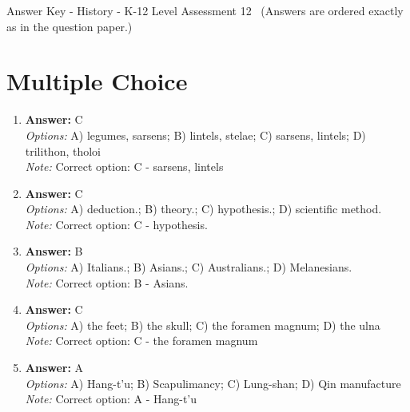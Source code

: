 \documentclass[12pt]{article}
\begin{document}
\begin{center}
Answer Key - History - K-12 Level Assessment 12 \
\small (Answers are ordered exactly as in the question paper.)
\end{center}

\section*{Multiple Choice}
\begin{enumerate}[label=\arabic*.]
\item \textbf{Answer:} C
\\ \textit{Options:} A) legumes, sarsens; B) lintels, stelae; C) sarsens, lintels; D) trilithon, tholoi
\\ \textit{Note:} Correct option: C - sarsens, lintels
\item \textbf{Answer:} C
\\ \textit{Options:} A) deduction.; B) theory.; C) hypothesis.; D) scientific method.
\\ \textit{Note:} Correct option: C - hypothesis.
\item \textbf{Answer:} B
\\ \textit{Options:} A) Italians.; B) Asians.; C) Australians.; D) Melanesians.
\\ \textit{Note:} Correct option: B - Asians.
\item \textbf{Answer:} C
\\ \textit{Options:} A) the feet; B) the skull; C) the foramen magnum; D) the ulna
\\ \textit{Note:} Correct option: C - the foramen magnum
\item \textbf{Answer:} A
\\ \textit{Options:} A) Hang-t'u; B) Scapulimancy; C) Lung-shan; D) Qin manufacture
\\ \textit{Note:} Correct option: A - Hang-t'u
\end{enumerate}
\end{document}
